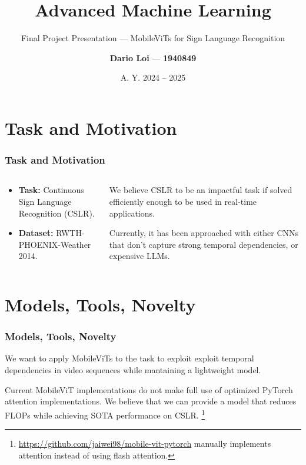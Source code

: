 \documentclass[english, xcolor={table}]{beamer}
\author{\textbf{Dario Loi} --- \textbf{1940849}}
\title{Advanced Machine Learning}
\subtitle{Final Project Presentation --- MobileViTs for Sign Language Recognition}
\institute{M.Sc. in Computer Science, \\ Sapienza, University of Rome.}
\date{A. Y. 2024 -- 2025}
\begin{document}
\maketitle

\section{Task and Motivation}

\begin{frame}
  \frametitle{Task and Motivation}

  \begin{columns}
    \begin{column}{0.4\textwidth}
      \begin{itemize}
        \item \textbf{Task:} Continuous Sign Language Recognition (CSLR).
        \item \textbf{Dataset:} RWTH-PHOENIX-Weather 2014.
      \end{itemize}
    \end{column}
    \begin{column}{0.6\textwidth}
        We believe CSLR to be an impactful task if solved efficiently enough to be used in real-time applications.


        Currently, it has been approached with either CNNs\cite{hu_continuous_2023, ahn_slowfast_2023} that don't capture strong temporal dependencies,
        or expensive LLMs\cite{gong_llms_2024}. 
      \end{column}
  \end{columns}
\end{frame}

\section{Models, Tools, Novelty}
\begin{frame}
  \frametitle{Models, Tools, Novelty}

  We want to apply MobileViTs\cite{mehta_mobilevit_2022} to the task to exploit exploit temporal dependencies in video sequences while mantaining a lightweight model.

  \vspace{1em}

  Current MobileViT implementations do not make full use of optimized PyTorch attention implementations. We believe that we can provide a model that reduces FLOPs while achieving SOTA performance on CSLR.
      \footnote{
        \url{https://github.com/jaiwei98/mobile-vit-pytorch} manually implements attention instead of using flash attention. }

\end{frame}
\end{document}
